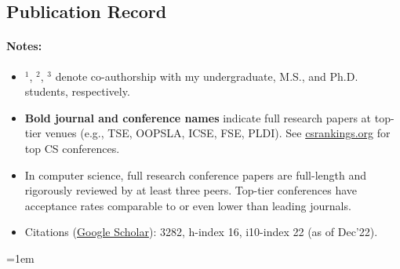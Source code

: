 \documentclass[10pt]{article}
\newcommand{\coe}[1]{\iftoggle{usecoe}{#1}{}}
\newcommand{\mygooglescholar}{\href{https://scholar.google.com/citations?user=TLcVQ-MAAAAJ}{Google Scholar}}
\newcommand{\mypubcc}[1]{\item~\label{#1} \fullcite{\detokenize{#1}c}}
\begin{document}
\subsection{Publication Record}

\paragraph{Notes:}
\begin{itemize}
\item \(^1\), \(^2\), \(^3\) denote co-authorship with my undergraduate, M.S., and Ph.D. students, respectively.
\item  \textbf{Bold journal and conference names} indicate full research papers at top-tier venues (e.g., TSE, OOPSLA, ICSE, FSE, PLDI). See \href{https://csrankings.org}{csrankings.org} for top CS conferences.
\item In computer science, full research conference papers are full-length and rigorously reviewed by at least three peers. Top-tier conferences have acceptance rates comparable to or even lower than leading journals.
\item Citations (\mygooglescholar{}): 3282, h-index 16, i10-index 22 (as of Dec'22).  
\end{itemize}

\emergencystretch=1em
\newcommand{\mybooks}{
  \begin{enumerate}
    \mypubcc{kapur2013geometric}
  \end{enumerate}
}

\newcommand{\myjournals}{
  \begin{enumerate}[label=J\arabic*]
    
    \mypubcc{nguyen2021using}
    \coe{\mypubcc{ishimwe2021dynaplex}}
    \coe{\mypubcc{le2020dynamite}}

    \coe{\mypubcc{mariano2019program}}

    \mypubcc{nguyen2014dig}

    \mypubcc{le2011genprog}
    \begin{itemize}
    \item \textbf{Featured Article}
    \item \textbf{1000+ citations}
    \end{itemize}
    
    \mypubcc{weimer2010automatic}
    \begin{itemize}
    \item \textbf{Research Highlight}
    \item \textbf{400+ citations}
    \end{itemize}
    
    \mypubcc{bui2008ant}
    \begin{itemize}
    \item \textbf{100+ citations}
    \end{itemize}
    
    \mypubcc{smith2007autonomous}
    
  \end{enumerate}
}
\end{document}
